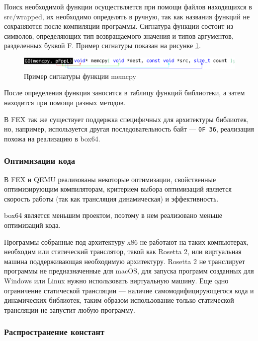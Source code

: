 Поиск необходимой функции осуществляется при помощи файлов находящихся в src/wrapped, их необходимо определять в ручную, так как названия функций не сохраняются после компиляции программы. Сигнатура функции состоит из символов, определяющих тип возвращаемого значения и типов аргументов, разделенных буквой F. Пример сигнатуры показан на рисунке \ref{fig:box64sig}.

\begin{figure}[hbtp]
	\centering
	\includegraphics[width=\textwidth]{img/function.eps}
	\caption{Пример сигнатуры функции memcpy}
	\label{fig:box64sig}
\end{figure}

После определения функция заносится в таблицу функций библиотеки, а затем находится при помощи разных методов. \cite{box64_deep}

В FEX так же существует поддержка специфичных для архитектуры библиотек, но, например, используется другая последовательность байт --- \texttt{0F 36}, реализация похожа на реализацию в box64.

\subsubsection{Оптимизации кода}

В FEX и QEMU реализованы некоторые оптимизации, свойственные оптимизирующим компиляторам, критерием выбора оптимизаций является скорость работы (так как трансляция динамическая) и эффективность.

box64 является меньшим проектом, поэтому в нем реализовано меньше оптимизаций кода.

Программы собранные под архитектуру x86 не работают на таких компьютерах, необходим или статический транслятор, такой как Rosetta 2, или виртуальная машина поддерживающая необходимую архитектуру. Rosetta 2 не транслирует программы не предназначенные для macOS, для запуска программ созданных для Windows или Linux нужно использовать виртуальную машину. Еще одно ограничение статической трансляции --- наличие самомодифицирующегося кода и динамических библиотек, таким образом использование только статической трансляции не запустит любую программу. \cite{fast_bin}

\subsubsection{Распространение констант}

